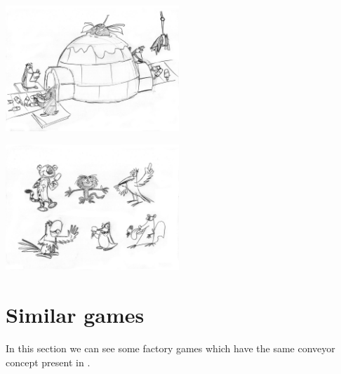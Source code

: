 \documentclass[a4paper]{scrartcl}
\begin{document}
    \begin{multicols}{2}
       \includegraphics[width=0.49\textwidth]{references/05}

       \includegraphics[width=0.49\textwidth]{references/06}
    \end{multicols}    

\section{Similar games}
    In this section we can see some factory games which have the same conveyor
    concept present in \gamename.
\end{document}
